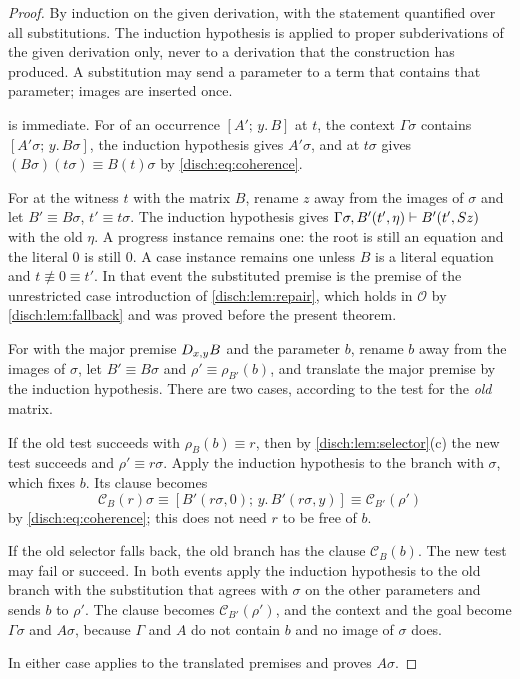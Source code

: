 \begin{proof}
By induction on the given derivation, with the statement quantified over
all substitutions. The induction hypothesis is applied to proper
subderivations of the given derivation only, never to a derivation that
the construction has produced. A substitution may send a parameter to a
term that contains that parameter; images are inserted once.

 is immediate. For  of an occurrence
$[A';\,y.\,B]$ at $t$, the context $\Gamma\sigma$ contains
$[A'\sigma;\,y.\,B\sigma]$, the induction hypothesis gives $A'\sigma$, and
 at $t\sigma$ gives $(B\sigma)(t\sigma)\equiv B(t)\sigma$ by
\eqref{disch:eq:coherence}.

For  at the witness $t$ with the matrix $B$, rename $z$
away from the images of $\sigma$ and let $B'\equiv B\sigma$,
$t'\equiv t\sigma$. The induction hypothesis gives
$\Gamma\sigma,B'(t',\eta)\vdash B'(t',S z)$ with the old $\eta$. A
progress instance remains one: the root is still an equation and the
literal $0$ is still $0$. A case instance remains one unless $B$ is a
literal equation and $t\not\equiv 0\equiv t'$. In that event the
substituted premise is the premise of the unrestricted case introduction
of \cref{disch:lem:repair}, which holds in $\mathcal O$ by
\cref{disch:lem:fallback} and was proved before the present theorem.

For  with the major premise $D_{x,y}B$ and the parameter
$b$, rename $b$ away from the images of $\sigma$, let $B'\equiv B\sigma$
and $\rho'\equiv\rho_{B'}(b)$, and translate the major premise by the
induction hypothesis. There are two cases, according to the test for the
\emph{old} matrix.

If the old test succeeds with $\rho_B(b)\equiv r$, then by
\cref{disch:lem:selector}(c) the new test succeeds and
$\rho'\equiv r\sigma$. Apply the induction hypothesis to the branch with
$\sigma$, which fixes $b$. Its clause becomes
\[
 \mathcal C_B(r)\sigma\equiv[B'(r\sigma,0);\,y.\,B'(r\sigma,y)]
 \equiv\mathcal C_{B'}(\rho')
\]
by \eqref{disch:eq:coherence}; this does not need $r$ to be free of $b$.

If the old selector falls back, the old branch has the clause
$\mathcal C_B(b)$. The new test may fail or succeed. In both events apply
the induction hypothesis to the old branch with the substitution that
agrees with $\sigma$ on the other parameters and sends $b$ to $\rho'$.
The clause becomes $\mathcal C_{B'}(\rho')$, and the context and the goal
become $\Gamma\sigma$ and $A\sigma$, because $\Gamma$ and $A$ do not
contain $b$ and no image of $\sigma$ does.

In either case  applies to the translated premises and
proves $A\sigma$.
\end{proof}

